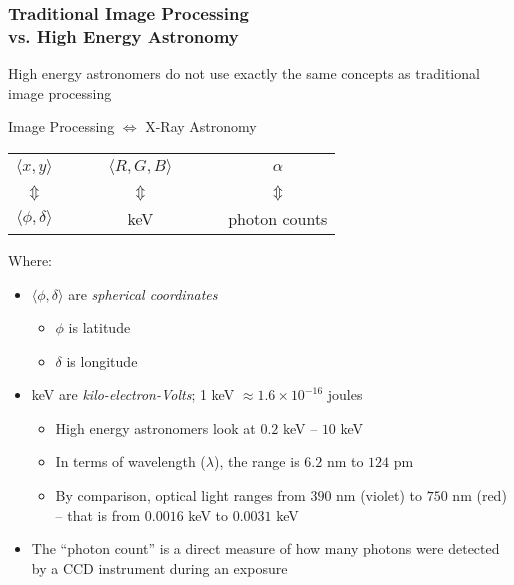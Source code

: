 \begin{frame}[allowframebreaks]
\frametitle{Traditional Image Processing \\
vs. High Energy Astronomy}
High energy astronomers \alert{do not} use exactly the same concepts as traditional image processing
\begin{center}
  \begin{minipage}{0.75\textwidth}
\begin{block}{\centering Image Processing $\Leftrightarrow$ X-Ray Astronomy}
\begin{center}
      \begin{tabular}{ccccc}
      $\langle x, y\rangle$ & \ \ \ & $\langle R, G, B\rangle$ & \ \ \ & $\alpha$\\
      $\Updownarrow$  & & $\Updownarrow$  &  & $\Updownarrow$ \\
      $\langle \phi, \delta\rangle$ &  & \textup{keV} &  & \textup{photon counts}
      \end{tabular}
\end{center}
\end{block}
\end{minipage}
\end{center}

\framebreak

Where:
\begin{itemize}
\item $\langle \phi,\delta\rangle$ are \emph{spherical coordinates}
	\begin{itemize}
	\item $\phi$ is latitude
	\item $\delta$ is longitude
	\end{itemize}
\item keV are \emph{kilo-electron-Volts}; 1 keV $\approx 1.6\times10^{-16}$ joules
	\begin{itemize}
	\item High energy astronomers look at $0.2$ keV -- $10$ keV
	\item In terms of wavelength ($\lambda$), the range is $6.2$ nm to $124$ pm
	\item By comparison, optical light ranges from $390$ nm (violet) to $750$ nm (red) -- that is from $0.0016$ keV to $0.0031$ keV
	\end{itemize}
\item The ``photon count'' is a direct measure of how many photons were detected by a CCD instrument during an exposure
\end{itemize}
\end{frame}
